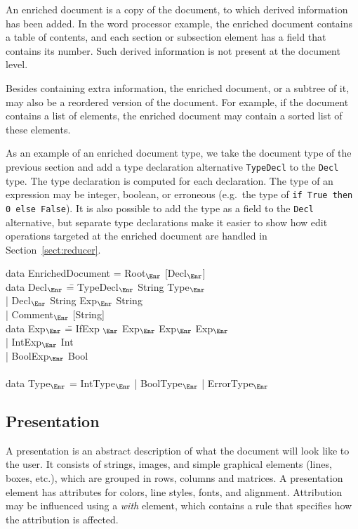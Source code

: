 An enriched document is a copy of the document, to which derived information has been added. In the word processor example, the enriched document contains a table of contents, and each section or subsection element has a field that contains its number. Such derived information is not present at the document level.

Besides containing extra information, the enriched document, or a subtree of it, may also be a reordered version of the document. For example, if the document contains a list of elements, the enriched document may contain a sorted list of these elements.

As an example of an enriched document type, we take the document type of the previous section and add a type declaration alternative {\tt TypeDecl} to the {\tt Decl} type. The type declaration is computed for each declaration. The type of an expression may be integer, boolean, or erroneous (e.g.\ the type of {\tt if True then 0 else False}). It is also possible to add the type as a field to the {\tt Decl} alternative, but separate type declarations make it easier to show how edit operations targeted at the enriched document are handled in Section~\ref{sect:reducer}.

\noindent
\ttfamily
\begin{tabbing}
data EnrichedDocument = Root$_{\Enr}$ [Decl$_{\Enr}$]\\
data Decl$_{\Enr}$ \= = TypeDecl$_{\Enr}$ String Type$_{\Enr}$\\
                           \> | Decl$_{\Enr}$ String Exp$_{\Enr}$ String\\
                           \> | Comment$_{\Enr}$ [String]\\
data Exp$_{\Enr}$ \= =  IfExp $_{\Enr}$ Exp$_{\Enr}$ Exp$_{\Enr}$ Exp$_{\Enr}$\\
                 \> | IntExp$_{\Enr}$ Int\\
                 \> | BoolExp$_{\Enr}$ Bool\\
\\
data Type$_{\Enr}$ = IntType$_{\Enr}$ | BoolType$_{\Enr}$ | ErrorType$_{\Enr}$
\end{tabbing}
\rmfamily


%																
\subsection{Presentation} \label{sect:presLevel}

A presentation is an abstract description of what the document will look like to the user. It consists of strings, images, and simple graphical elements (lines, boxes, etc.), which are grouped in rows, columns and matrices. A presentation element has attributes for colors, line styles, fonts, and alignment. Attribution may be influenced using a {\em with} element, which contains a rule that specifies how the attribution is affected.

